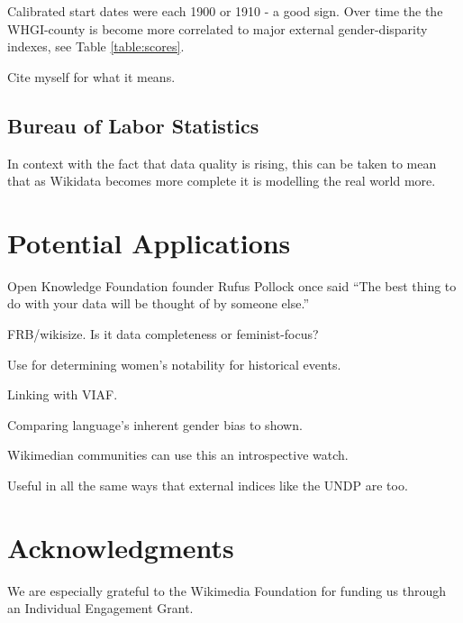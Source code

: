 \documentclass[letterpaper]{article}
\begin{document}
Calibrated start dates were each 1900 or 1910 - a good sign. Over time the the WHGI-county is become more correlated to major external gender-disparity indexes, see Table \ref{table:scores}.

Cite myself for what it means. 


\subsection{Bureau of Labor Statistics}


 In context with the fact that data quality is rising, this can be taken to mean that as Wikidata becomes more complete it is modelling the real world more. 

\section{Potential Applications}
Open Knowledge Foundation founder Rufus Pollock once said ``The best thing to do with your data will be thought of by someone else.”

FRB/wikisize. Is it data completeness or feminist-focus?


Use for determining women's notability for historical events.

Linking with VIAF. 

Comparing language's inherent gender bias to shown.

Wikimedian communities can use this an introspective watch.

Useful in all the same ways that external indices like the UNDP are too.


\section{ Acknowledgments}
We are especially grateful to the Wikimedia Foundation for funding us through an Individual Engagement Grant.



\end{document}
